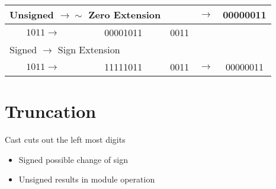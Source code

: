 \begin{center}
\begin{tabular}{|c|c|c|c|c|}
\hline
\multicolumn{2}{|l|}{Unsigned $\rightarrow \boldsymbol{\sim}$ Zero Extension} &  & \multirow[b]{2}{*}{$\rightarrow$} & \multirow[b]{2}{*}{00000011} \\
\hline
$1011 \rightarrow$ & 00001011 & 0011 &  &  \\
\hline
\multicolumn{5}{|l|}{Signed $\boldsymbol{\rightarrow}$ Sign Extension} \\
\hline
$1011 \rightarrow$ & 11111011 & 0011 & $\rightarrow$ & 00000011 \\
\hline
\end{tabular}
\end{center}

\section*{Truncation}
Cast cuts out the left most digits

\begin{itemize}
  \item Signed possible change of sign
  \item Unsigned results in module operation
\end{itemize}

